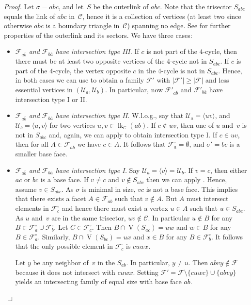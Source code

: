 \documentclass[a4paper,12pt]{amsart}
\theoremstyle{plain}
\theoremstyle{definition}
\newcommand{\U}{\mathcal U}
\newcommand{\C}{\mathcal C}
\newcommand{\family}{\mathcal F}
\newcommand{\facetA}{A}
\newcommand{\facetB}{B}
\newcommand{\facetC}{C}
\newcommand{\face}{\sigma}
\DeclareMathOperator{\link}{lk}
\DeclareMathOperator{\vertices}{V}
\begin{document}
\begin{proof}
Let $\face = abc$, and let~$S$ be the outerlink of $abc$. Note that the trisector $S_{abc}$ equals the link of $abc$ in~$\C$, hence it is
a collection of vertices (at least two since otherwise $abc$ is a boundary triangle in~$\C$) spanning no edge.
See  for further properties of the outerlink and its sectors. We have three cases:

\begin{itemize}
  \item \emph{$\family_{a\overline b}$ and $\family_{b\overline a}$ have intersection type III. } If $c$ is not part of the $4$-cycle, then there must be at least two opposite vertices of the $4$-cycle not in $S_{abc}$. If $c$ is part of the $4$-cycle, the vertex opposite $c$ in the $4$-cycle is not in $S_{abc}$. Hence, in both cases we can use  to obtain a family $\family'$ with $|\family'| \geq |\family| $ and less essential vertices in $(\U_a,\U_b)$. In particular, now $\family'_{a\overline b}$ and $\family'_{b\overline a}$ have intersection type I or II.

  \item \emph{$\family_{a\overline b}$ and $\family_{b\overline a}$ have intersection type II. } W.l.o.g., say that $\U_a = \langle uv \rangle$, and $\U_b = \langle u,v \rangle$ for two vertices $u,v \in \link_\C (ab)$. If $c \not \in uv$, then one of $u$ and~$v$ is not in $S_{abc}$ and, again, we can apply  to obtain intersection type I. If $c \in uv$, then for all $\facetA \in \family_{a\overline b}$ we have $c \in \facetA$. It follows that $\family_a^\circ = \emptyset$, and $\face' = bc$ is a smaller base face.

  \item \emph{$\family_{a\overline b}$ and $\family_{b\overline a}$ have intersection type I. } Say $\U_a = \langle v \rangle = \U_b$. If $v=c$, then either $ac$ or $bc$ is a base face. If $v \neq c$ and $v \not \in S_{abc}$ then we can apply . Hence, assume $v \in S_{abc}$. As $\face$ is minimal in size, $vc$ is not a base face. This implies that there exists a facet $\facetA \in \family_{ab}$ such that $v\notin \facetA$. But $\facetA$ must intersect elements in $\family_c^\circ$ and hence there must exist a vertex $u\in \facetA$ such that $u \in S_{abc}$. As $u$ and~$v$ are in the same trisector, $uv \notin \C$. In particular $u\notin \facetB$ for any $\facetB \in \family_a^\circ \cup \family_b^\circ$. Let $\facetC \in \family_c^\circ$. Then $\facetB\cap \vertices(S_{ac}) = uw$ and $w\in \facetB$ for any $\facetB \in \family_a^\circ$. Similarly, $\facetB\cap \vertices(S_{bc}) = ux$ and $x\in \facetB$ for any $\facetB \in \family_b^\circ$. It follows that the only possible element in $\family_c^\circ$ is $cuwx$.

Let $y$ be any neighbor of~$v$ in the $S_{ab}$. In particular, $y \neq u$. Then $abvy \not \in \family$ because it does not intersect with $cuwx$. Setting $\family' = \family \setminus \{ cuwc \} \cup \{ abvy \}$ yields an intersecting family of equal size with base face $ab$.
\end{itemize}

\end{proof}
\end{document}
